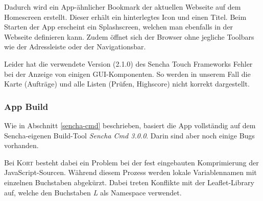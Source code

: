 Dadurch wird ein App-ähnlicher Bookmark der aktuellen Webseite auf dem Homescreen erstellt.
Dieser erhält ein hinterlegtes Icon und einen Titel.
Beim Starten der App erscheint ein Splashscreen, welchen man ebenfalls in der Webseite definieren kann. Zudem öffnet sich der Browser ohne jegliche Toolbars wie der Adressleiste oder der Navigationsbar.

Leider hat die verwendete Version (2.1.0) des Sencha Touch Frameworks Fehler bei der Anzeige von einigen GUI-Komponenten.
So werden in unserem Fall die Karte (Aufträge) und alle Listen (Prüfen, Highscore) nicht korrekt dargestellt.

\subsubsection{App Build}
Wie in Abschnitt \ref{sencha-cmd} beschrieben, basiert die App vollständig auf dem Sencha-eigenen Build-Tool \emph{Sencha Cmd 3.0.0}. Darin sind aber noch einige Bugs vorhanden.

Bei \textsc{Kort} besteht dabei ein Problem bei der fest eingebauten Komprimierung der JavaScript-Sourcen.
Während diesem Prozess werden lokale Variablennamen mit einzelnen Buchstaben abgekürzt.
Dabei treten Konflikte mit der Leaflet-Library auf, welche den Buchstaben \emph{L} als Namespace verwendet.